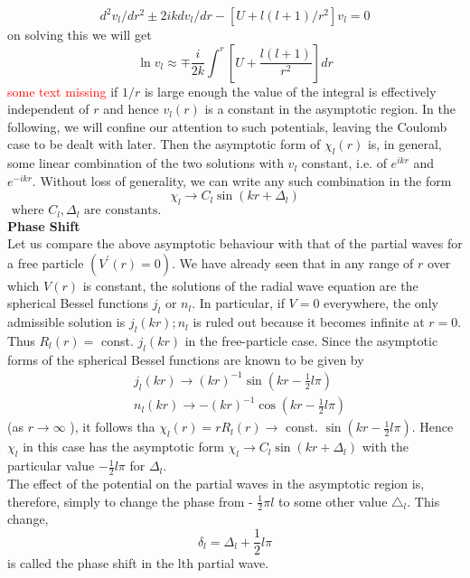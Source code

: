 $$
d^{2} v_{l} / d r^{2} \pm 2 i k d v_{l} / d r-\left[U+l(l+1) / r^{2}\right] v_{l}=0
$$
on solving this we will get\\
$$\ln v_{l} \approx \mp \frac{i}{2 k} \int^{r}\left[U+\frac{l(l+1)}{r^{2}}\right] d r$$
\textcolor{red}{some text missing} if $1/r$ is large enough the value of the integral is effectively independent of $r$ and hence $v_{l}(r)$ is a constant in the asymptotic region. In the following, we will confine our attention to such potentials, leaving the Coulomb case to be dealt with later. Then the asymptotic form of $\chi_{l}(r)$ is, in general, some linear combination of the two solutions with $v_{l}$ constant, i.e. of $e^{i k r}$ and $e^{-ikr}$. Without loss of generality, we can write any such combination in the form\\
$${\chi}_{l} \rightarrow C_{l} \sin \left(k r+\Delta_{l}\right)$$
$\text { where } C_{l}, \Delta_{l} \text { are constants. }$\\
\textbf{Phase Shift}\\
 Let us compare the above asymptotic behaviour with that of the partial waves for a free particle $\left(V^{\prime}(r)=0\right)$. We have already seen  that in any range of $r$ over which $V(r)$ is constant, the solutions of the radial wave equation are the spherical Bessel functions $j_{l}$ or $n_{l}$. In particular, if $V=0$ everywhere, the only admissible solution is $j_{l}(k r) ; n_{l}$ is ruled out because it becomes infinite at $r=0$. Thus $R_{l}(r)=$ const. $j_{l}(k r)$ in the free-particle case. Since the asymptotic forms of the spherical Bessel functions are known to be given by
 $$\begin{aligned}
 	&j_{l}(k r) \rightarrow(k r)^{-1} \sin \left(k r-\frac{1}{2} l \pi\right) \\
 	&n_{l}(k r) \rightarrow-(k r)^{-1} \cos \left(k r-\frac{1}{2} l \pi\right)
 \end{aligned}$$
 (as $r \rightarrow \infty$ ), it follows tha $\chi_{l}(r)=r R_{l}(r) \rightarrow$ const. $\sin \left(k r-\frac{1}{2} l \pi\right)$. Hence $\chi_{l}$ in this case has the asymptotic form ${\chi}_{l} \rightarrow C_{l} \sin \left(k r+\Delta_{l}\right)$ with the particular value $-\frac{1}{2} l \pi$ for $\Delta_{l}$.\\
 The effect of the potential on the partial waves in the asymptotic region is, therefore, simply to change the phase from - $\frac{1}{2} \pi l$ to some other value $\triangle_{l}$. This change,
 $$
 \delta_{l}=\Delta_{l}+\frac{1}{2} l \pi
 $$
 is called the phase shift in the lth partial wave.
